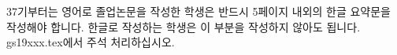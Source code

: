 \begin{summary}
37기부터는 영어로 졸업논문을 작성한 학생은 반드시 5페이지 내외의 한글 요약문을 작성해야 합니다. 한글로 작성하는 학생은 이 부분을 작성하지 않아도 됩니다. gs19xxx.tex에서 주석 처리하십시오.
\end{summary}

